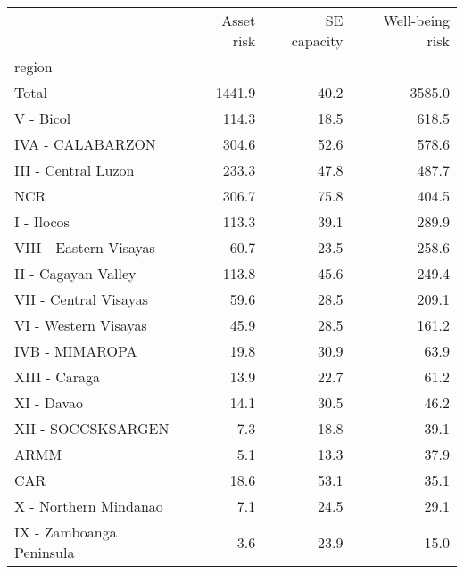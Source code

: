 \begin{tabular}{lrrr}
\toprule
{} &  Asset risk &  SE capacity &  Well-being risk \\
region                   &             &              &                  \\
\midrule
Total                    &      1441.9 &         40.2 &           3585.0 \\
V - Bicol                &       114.3 &         18.5 &            618.5 \\
IVA - CALABARZON         &       304.6 &         52.6 &            578.6 \\
III - Central Luzon      &       233.3 &         47.8 &            487.7 \\
NCR                      &       306.7 &         75.8 &            404.5 \\
I - Ilocos               &       113.3 &         39.1 &            289.9 \\
VIII - Eastern Visayas   &        60.7 &         23.5 &            258.6 \\
II - Cagayan Valley      &       113.8 &         45.6 &            249.4 \\
VII - Central Visayas    &        59.6 &         28.5 &            209.1 \\
VI - Western Visayas     &        45.9 &         28.5 &            161.2 \\
IVB - MIMAROPA           &        19.8 &         30.9 &             63.9 \\
XIII - Caraga            &        13.9 &         22.7 &             61.2 \\
XI - Davao               &        14.1 &         30.5 &             46.2 \\
XII - SOCCSKSARGEN       &         7.3 &         18.8 &             39.1 \\
ARMM                     &         5.1 &         13.3 &             37.9 \\
CAR                      &        18.6 &         53.1 &             35.1 \\
X - Northern Mindanao    &         7.1 &         24.5 &             29.1 \\
IX - Zamboanga Peninsula &         3.6 &         23.9 &             15.0 \\
\bottomrule
\end{tabular}
